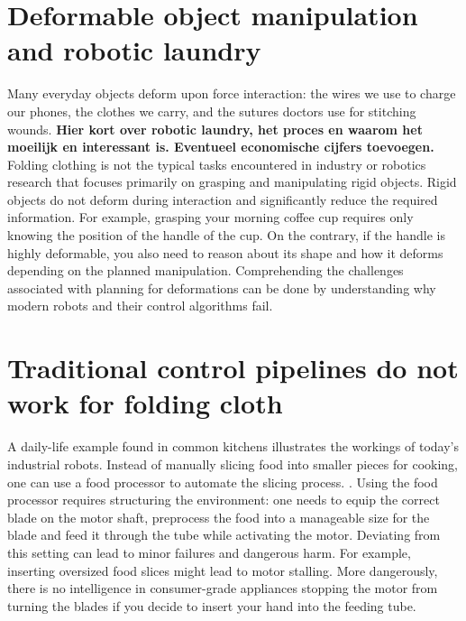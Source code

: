 \documentclass[\home/main.tex]{subfiles}
\begin{document}

\section{Deformable object manipulation and robotic laundry}
Many everyday objects deform upon force interaction: the wires we use to charge our phones, the clothes we carry, and the sutures doctors use for stitching wounds.
\textbf{Hier kort over robotic laundry, het proces en waarom het moeilijk en interessant is. Eventueel economische cijfers toevoegen.}
Folding clothing is not the typical tasks encountered in industry or robotics research that focuses primarily on grasping and manipulating rigid objects. Rigid objects do not deform during interaction and significantly reduce the required information. For example, grasping your morning coffee cup requires only knowing the position of the handle of the cup.
On the contrary, if the handle is highly deformable, you also need to reason about its shape and how it deforms depending on the planned manipulation.
Comprehending the challenges associated with planning for deformations can be done by understanding why modern robots and their control algorithms fail.

\section{Traditional control pipelines do not work for folding cloth}
A daily-life example found in common kitchens illustrates the workings of today's industrial robots. Instead of manually slicing food into smaller pieces for cooking, one can use a food processor to automate the slicing process.
. Using the food processor requires structuring the environment: one needs to equip the correct blade on the motor shaft, preprocess the food into a manageable size for the blade and feed it through the tube while activating the motor. Deviating from this setting can lead to minor failures and dangerous harm. For example, inserting oversized food slices might lead to motor stalling. More dangerously, there is no intelligence in consumer-grade appliances stopping the motor from turning the blades if you decide to insert your hand into the feeding tube.
\end{document}
